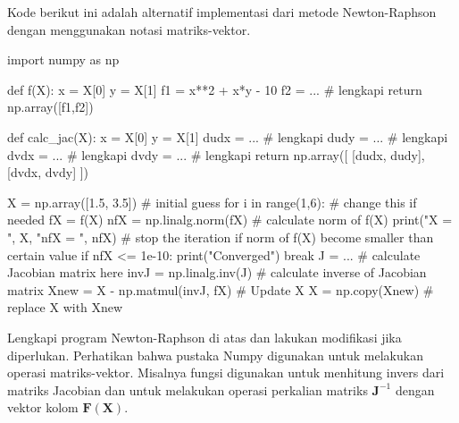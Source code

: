 Kode berikut ini adalah alternatif implementasi dari metode Newton-Raphson
dengan menggunakan notasi matriks-vektor.
\begin{pythoncode}
import numpy as np

def f(X):
    x = X[0]
    y = X[1]
    f1 = x**2 + x*y - 10
    f2 = ... # lengkapi 
    return np.array([f1,f2])

def calc_jac(X):
    x = X[0]
    y = X[1]
    dudx = ... # lengkapi
    dudy = ... # lengkapi
    dvdx = ... # lengkapi
    dvdy = ... # lengkapi
    return np.array([
        [dudx, dudy],
        [dvdx, dvdy]
    ])
    
X = np.array([1.5, 3.5]) # initial guess
for i in range(1,6): # change this if needed
    fX = f(X)
    nfX = np.linalg.norm(fX) # calculate norm of f(X)
    print("X = ", X, "nfX = ", nfX)
    # stop the iteration if norm of f(X) become smaller than certain value
    if nfX <= 1e-10:
        print("Converged")
        break
    J = ... # calculate Jacobian matrix here
    invJ = np.linalg.inv(J) # calculate inverse of Jacobian matrix
    Xnew = X - np.matmul(invJ, fX)  # Update X
    X = np.copy(Xnew)  # replace X with Xnew
\end{pythoncode}

\begin{soal}
Lengkapi program Newton-Raphson di atas dan lakukan modifikasi jika diperlukan.
Perhatikan bahwa pustaka Numpy digunakan untuk melakukan
operasi matriks-vektor. Misalnya fungsi  digunakan untuk
menhitung invers dari matriks Jacobian dan  untuk melakukan operasi
perkalian matriks $\mathbf{J}^{-1}$ dengan vektor kolom $\mathbf{F}(\mathbf{X})$.
\end{soal}